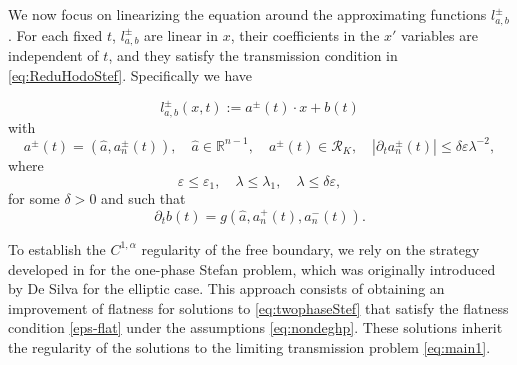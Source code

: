 \documentclass[12pt]{article}
\newcommand{\nor}[1]{\left\lvert#1\right\rvert}
\numberwithin{Theorem}{section}
\theoremstyle{definition}
\theoremstyle{remark}
\numberwithin{equation}{section}
\newcommand{\p}{\partial}
\begin{document}
We now focus on linearizing the equation around the approximating functions $l_{a,b}^{\pm}$. For each fixed $t$, $l_{a,b}^{\pm}$ are linear in $x$, their coefficients in the $x'$ variables are independent of $t$, and they satisfy the transmission condition in \eqref{eq:ReduHodoStef}. Specifically we have

\[
l_{a,b}^{\pm}(x,t):= a^{\pm}(t) \cdot x + b(t)
\]
with 
\begin{equation} \label{Hp:condit-assum-flat}
a^{\pm}(t)=(\hat a, a_n^{\pm}(t)), \quad \hat a \in \mathbb{R}^{n-1}, \quad a^{\pm}(t) \in \mathcal{R}_{K},\quad \nor{{\p_t}a_n^{\pm}(t)} \leq \delta \varepsilon \lambda^{-2},
\end{equation}
 where
    \begin{equation*}
        \varepsilon \leq \varepsilon_{1}, \quad \lambda \leq \lambda_{1}, \quad \lambda \leq \delta \varepsilon,
    \end{equation*}
for some $\delta>0$ and such that 
\[
{\p_t}b(t)=g(\hat a, a_n^{+}(t),a_n^{-}(t)).
\]

To establish the $C^{1,\alpha}$ regularity of the free boundary, we rely on the strategy developed in \cite{DFS23} for the one-phase Stefan problem, which was originally introduced by De Silva \cite{DeSilva2011} for the elliptic case. This approach consists of obtaining an improvement of flatness for solutions to \eqref{eq:twophaseStef} that satisfy the flatness condition \eqref{eps-flat} under the assumptions \eqref{eq:nondeghp}.
These solutions inherit the regularity of the solutions to the limiting transmission problem \eqref{eq:main1}. 
\end{document}
